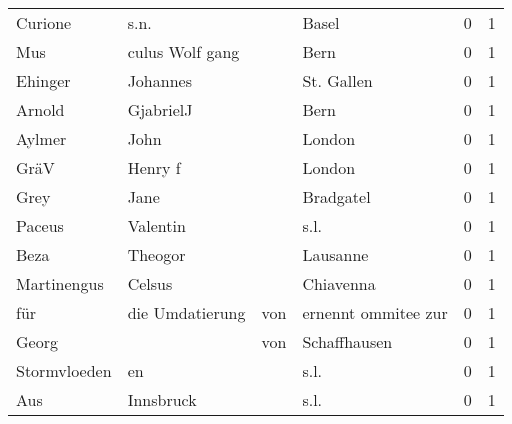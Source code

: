 \documentclass[10pt,a4paper,landscape]{article}
\begin{document}
\begin{longtable}{llllrr}
                  Curione &                               s.n. &             &                                       Basel &          0 &         1 \\
                      Mus &                    culus Wolf gang &             &                                        Bern &          0 &         1 \\
                  Ehinger &                           Johannes &             &                                  St. Gallen &          0 &         1 \\
                   Arnold &                          GjabrielJ &             &                                        Bern &          0 &         1 \\
                   Aylmer &                               John &             &                                      London &          0 &         1 \\
                     GräV &                            Henry f &             &                                      London &          0 &         1 \\
                     Grey &                               Jane &             &                                   Bradgatel &          0 &         1 \\
                   Paceus &                           Valentin &             &                                        s.l. &          0 &         1 \\
                     Beza &                            Theogor &             &                                    Lausanne &          0 &         1 \\
              Martinengus &                             Celsus &             &                                   Chiavenna &          0 &         1 \\
                      für &                    die Umdatierung &         von &                         ernennt ommitee zur &          0 &         1 \\
                    Georg &                                    &         von &                                Schaffhausen &          0 &         1 \\
             Stormvloeden &                                 en &             &                                        s.l. &          0 &         1 \\
                      Aus &                          Innsbruck &             &                                        s.l. &          0 &         1 \\

\end{longtable}
\end{document}
